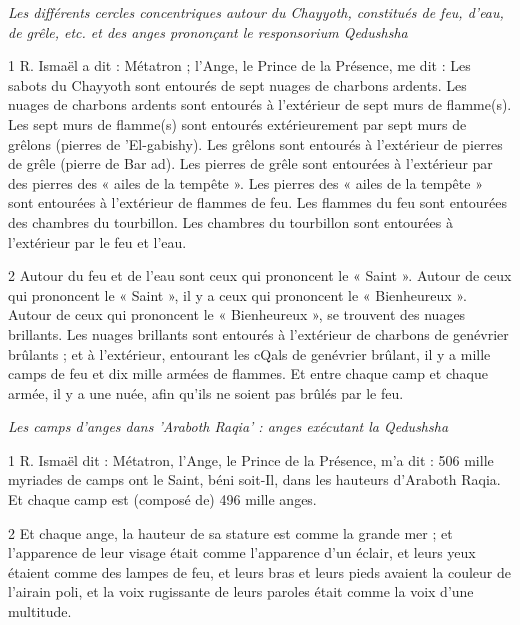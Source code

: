 
\par \textit{Les différents cercles concentriques autour du Chayyoth, constitués de feu, d'eau, de grêle, etc. et des anges prononçant le responsorium Qedushsha}

\par 1 R. Ismaël a dit : Métatron ; l'Ange, le Prince de la Présence, me dit : Les sabots du Chayyoth sont entourés de sept nuages ​​de charbons ardents. Les nuages ​​de charbons ardents sont entourés à l’extérieur de sept murs de flamme(s). Les sept murs de flamme(s) sont entourés extérieurement par sept murs de grêlons (pierres de 'El-gabishy). Les grêlons sont entourés à l'extérieur de pierres de grêle (pierre de Bar ad). Les pierres de grêle sont entourées à l'extérieur par des pierres des « ailes de la tempête ». Les pierres des « ailes de la tempête » sont entourées à l’extérieur de flammes de feu. Les flammes du feu sont entourées des chambres du tourbillon. Les chambres du tourbillon sont entourées à l’extérieur par le feu et l’eau.

\par 2 Autour du feu et de l'eau sont ceux qui prononcent le « Saint ». Autour de ceux qui prononcent le « Saint », il y a ceux qui prononcent le « Bienheureux ». Autour de ceux qui prononcent le « Bienheureux », se trouvent des nuages ​​brillants. Les nuages ​​brillants sont entourés à l'extérieur de charbons de genévrier brûlants ; et à l'extérieur, entourant les cQals de genévrier brûlant, il y a mille camps de feu et dix mille armées de flammes. Et entre chaque camp et chaque armée, il y a une nuée, afin qu'ils ne soient pas brûlés par le feu.


\par \textit{Les camps d'anges dans 'Araboth Raqia' : anges exécutant la Qedushsha}

\par 1 R. Ismaël dit : Métatron, l'Ange, le Prince de la Présence, m'a dit : 506 mille myriades de camps ont le Saint, béni soit-Il, dans les hauteurs d'Araboth Raqia. Et chaque camp est (composé de) 496 mille anges.

\par 2 Et chaque ange, la hauteur de sa stature est comme la grande mer ; et l'apparence de leur visage était comme l'apparence d'un éclair, et leurs yeux étaient comme des lampes de feu, et leurs bras et leurs pieds avaient la couleur de l'airain poli, et la voix rugissante de leurs paroles était comme la voix d'une multitude.

